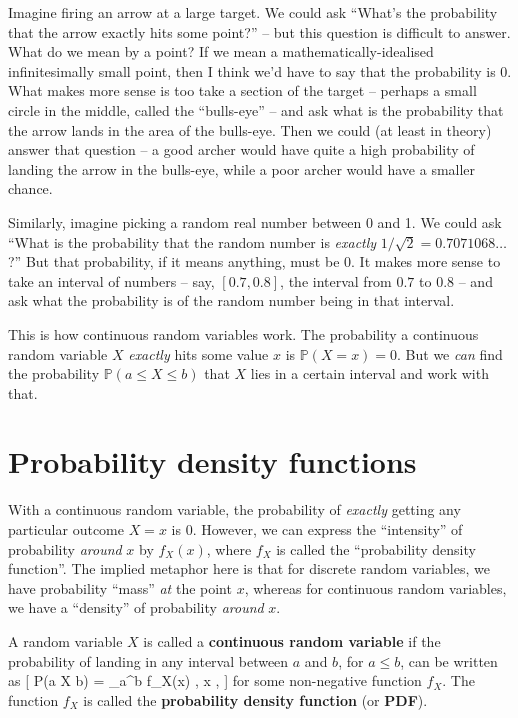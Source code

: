 \documentclass[
  letterpaper,
]{report}
\theoremstyle{definition}
\theoremstyle{definition}
\theoremstyle{remark}
\begin{document}
Imagine firing an arrow at a large target. We could ask ``What's the
probability that the arrow exactly hits some point?'' -- but this
question is difficult to answer. What do we mean by a point? If we mean
a mathematically-idealised infinitesimally small point, then I think
we'd have to say that the probability is 0. What makes more sense is too
take a section of the target -- perhaps a small circle in the middle,
called the ``bulls-eye'' -- and ask what is the probability that the
arrow lands in the area of the bulls-eye. Then we could (at least in
theory) answer that question -- a good archer would have quite a high
probability of landing the arrow in the bulls-eye, while a poor archer
would have a smaller chance.

Similarly, imagine picking a random real number between 0 and 1. We
could ask ``What is the probability that the random number is
\emph{exactly} \(1/\sqrt{2} = 0.7071068\dots\)?'' But that probability,
if it means anything, must be 0. It makes more sense to take an interval
of numbers -- say, \([0.7, 0.8]\), the interval from \(0.7\) to \(0.8\)
-- and ask what the probability is of the random number being in that
interval.

This is how continuous random variables work. The probability a
continuous random variable \(X\) \emph{exactly} hits some value \(x\) is
\(\mathbb P(X = x) = 0\). But we \emph{can} find the probability
\(\mathbb P(a \leq X \leq b)\) that \(X\) lies in a certain interval and
work with that.

\hypertarget{pdf}{%
\section{Probability density functions}\label{pdf}}

With a continuous random variable, the probability of \emph{exactly}
getting any particular outcome \(X = x\) is 0. However, we can express
the ``intensity'' of probability \emph{around} \(x\) by \(f_X(x)\),
where \(f_X\) is called the ``probability density function''. The
implied metaphor here is that for discrete random variables, we have
probability ``mass'' \emph{at} the point \(x\), whereas for continuous
random variables, we have a ``density'' of probability \emph{around}
\(x\).

A random variable \(X\) is called a \textbf{continuous random variable}
if the probability of landing in any interval between \(a\) and \(b\),
for \(a \leq b\), can be written as {[} \mathbb P(a \leq X \leq b) =
\int\_a\^{}b f\_X(x) , x , {]} for some non-negative function
\(f_X\). The function \(f_X\) is called the \textbf{probability density
function} (or \textbf{PDF}).
\end{document}
